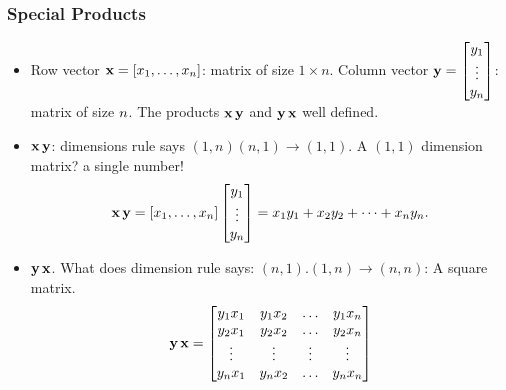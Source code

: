 \documentclass[8pt,dvipsnames]{beamer}
\begin{document}
\begin{frame}
  \frametitle{Special Products}
  \begin{itemize}
  \item Row vector ${\bf x} = [x_1,\dots,x_n]$: matrix of size $1\times n$. Column vector ${\bf y} =
    \begin{bmatrix}
      y_1\\\vdots\\y_n
    \end{bmatrix}
    $: matrix of size $n\time 1$. The products ${\bf x}\,{\bf y} $ and ${\bf y}\,{\bf x}$ well defined. 
  \item ${\bf x} \, {\bf y} $: dimensions rule says $(1,n)(n,1) \to (1,1)$. A $(1,1)$ dimension matrix? a single number!
    $$
    {\bf x}\,{\bf y}=  [x_1,\dots,x_n]     \begin{bmatrix}
      y_1\\\vdots\\y_n
    \end{bmatrix}
    = x_1 y_1 + x_2 y_2 + \dots + x_n y_n.
    $$
  \item ${\bf y}\,{\bf x}$. What does dimension rule says: $(n,1).(1,n)\to (n,n)$: A square matrix.
    $$
    {\bf y}\,{\bf x} =
    \begin{bmatrix}
      y_1 x_1 & y_1 x_2 & \hdots & y_1 x_n\\ 
      y_2 x_1 & y_2 x_2 & \hdots & y_2 x_n\\ 
      \vdots & \vdots &  \vdots & \vdots\\
      y_n x_1 & y_n x_2 & \hdots & y_n x_n\\ 
    \end{bmatrix}
    $$
  \end{itemize}
\end{frame}
\end{document}
